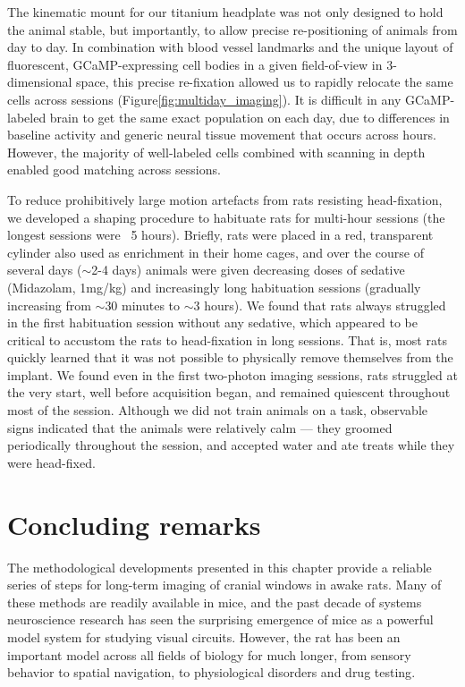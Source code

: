 The kinematic mount for our titanium headplate was not only designed to hold the animal stable, but importantly, to allow precise re-positioning of animals from day to day. In combination with blood vessel landmarks and the unique layout of fluorescent, GCaMP-expressing cell bodies in a given field-of-view in 3-dimensional space, this precise re-fixation allowed us to rapidly relocate the same cells across sessions (Figure\ref{fig:multiday_imaging}). It is difficult in any GCaMP-labeled brain to get the same exact population on each day, due to differences in baseline activity and generic neural tissue movement that occurs across hours. However, the majority of well-labeled cells combined with scanning in depth enabled good matching across sessions. 

To reduce prohibitively large motion artefacts from rats resisting head-fixation, we developed a shaping procedure to habituate rats for multi-hour sessions (the longest sessions were ~5 hours). Briefly, rats were placed in a red, transparent cylinder also used as enrichment in their home cages, and over the course of several days ($\sim$2-4 days) animals were given decreasing doses of sedative (Midazolam, 1mg/kg) and increasingly long habituation sessions (gradually increasing from $\sim$30 minutes to $\sim$3 hours). We found that rats always struggled in the first habituation session without any sedative, which appeared to be critical to accustom the rats to head-fixation in long sessions. That is, most rats quickly learned that it was not possible to physically remove themselves from the implant. We found even in the first two-photon imaging sessions, rats struggled at the very start, well before acquisition began, and remained quiescent throughout most of the session. Although we did not train animals on a task, observable signs indicated that the animals were relatively calm --- they groomed periodically throughout the session, and accepted water and ate treats while they were head-fixed. 

\section{Concluding remarks}
The methodological developments presented in this chapter provide a reliable series of steps for long-term imaging of cranial windows in awake rats. Many of these methods are readily available in mice, and the past decade of systems neuroscience research has seen the surprising emergence of mice as a powerful model system for studying visual circuits. However, the rat has been an important model across all fields of biology for much longer, from sensory behavior\cite{Lashley1930, REFREF} to spatial navigation\cite{OKeefe1971, Aronov2014, Eichenbaum1990}, to physiological disorders and drug testing\cite{REFREF}. 

